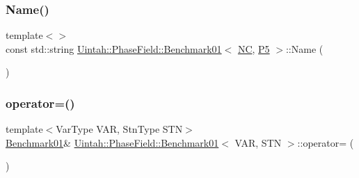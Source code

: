 \mbox{\label{classUintah_1_1PhaseField_1_1Benchmark01_a87c90fb809d6afa3f37b29f6fffd62f3}} 
\subsubsection{\texorpdfstring{Name()}{Name()}\hspace{0.1cm}{\footnotesize\ttfamily [2/2]}}
{\footnotesize\ttfamily template$<$$>$ \\
const std\+::string \hyperlink{classUintah_1_1PhaseField_1_1Benchmark01}{Uintah\+::\+Phase\+Field\+::\+Benchmark01}$<$ \hyperlink{namespaceUintah_1_1PhaseField_a33d355affda78a83f45755ba8388cedda77924170fe82bfd58b74ca3e44139718}{NC}, \hyperlink{namespaceUintah_1_1PhaseField_a24d833a720598df1020f5cc2e75f8702a218e7fca21085b602c79158a04bc83a0}{P5} $>$\+::Name (\begin{DoxyParamCaption}{ }\end{DoxyParamCaption})}

\mbox{\label{classUintah_1_1PhaseField_1_1Benchmark01_a78557f576ba2deb68ef0715766bb6f77}} 
\subsubsection{\texorpdfstring{operator=()}{operator=()}}
{\footnotesize\ttfamily template$<$Var\+Type V\+AR, Stn\+Type S\+TN$>$ \\
\hyperlink{classUintah_1_1PhaseField_1_1Benchmark01}{Benchmark01}\& \hyperlink{classUintah_1_1PhaseField_1_1Benchmark01}{Uintah\+::\+Phase\+Field\+::\+Benchmark01}$<$ V\+AR, S\+TN $>$\+::operator= (\begin{DoxyParamCaption}\item[{const \hyperlink{classUintah_1_1PhaseField_1_1Benchmark01}{Benchmark01}$<$ V\+AR, S\+TN $>$ \&}]{ }\end{DoxyParamCaption})\hspace{0.3cm}{\ttfamily [delete]}}



